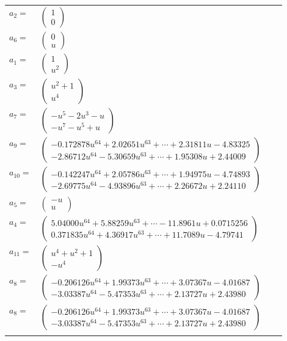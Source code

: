 \documentclass[1p]{elsarticle_modified}
\theoremstyle{definition}
\begin{document}
\begin{tabular}{m{7pt} m{180pt} m{7pt} m{180pt} }
\flushright $a_{2}=$&$\begin{pmatrix}1\\0\end{pmatrix}$ \\
\flushright $a_{6}=$&$\begin{pmatrix}0\\u\end{pmatrix}$ \\
\flushright $a_{1}=$&$\begin{pmatrix}1\\u^2\end{pmatrix}$ \\
\flushright $a_{3}=$&$\begin{pmatrix}u^2+1\\u^4\end{pmatrix}$ \\
\flushright $a_{7}=$&$\begin{pmatrix}- u^5-2 u^3- u\\- u^7- u^5+u\end{pmatrix}$ \\
\flushright $a_{9}=$&$\begin{pmatrix}-0.172878 u^{64}+2.02651 u^{63}+\cdots+2.31811 u-4.83325\\-2.86712 u^{64}-5.30659 u^{63}+\cdots+1.95308 u+2.44009\end{pmatrix}$ \\
\flushright $a_{10}=$&$\begin{pmatrix}-0.142247 u^{64}+2.05786 u^{63}+\cdots+1.94975 u-4.74893\\-2.69775 u^{64}-4.93896 u^{63}+\cdots+2.26672 u+2.24110\end{pmatrix}$ \\
\flushright $a_{5}=$&$\begin{pmatrix}- u\\u\end{pmatrix}$ \\
\flushright $a_{4}=$&$\begin{pmatrix}5.04000 u^{64}+5.88259 u^{63}+\cdots-11.8961 u+0.0715256\\0.371835 u^{64}+4.36917 u^{63}+\cdots+11.7089 u-4.79741\end{pmatrix}$ \\
\flushright $a_{11}=$&$\begin{pmatrix}u^4+u^2+1\\- u^4\end{pmatrix}$ \\
\flushright $a_{8}=$&$\begin{pmatrix}-0.206126 u^{64}+1.99373 u^{63}+\cdots+3.07367 u-4.01687\\-3.03387 u^{64}-5.47353 u^{63}+\cdots+2.13727 u+2.43980\end{pmatrix}$\\ \flushright $a_{8}=$&$\begin{pmatrix}-0.206126 u^{64}+1.99373 u^{63}+\cdots+3.07367 u-4.01687\\-3.03387 u^{64}-5.47353 u^{63}+\cdots+2.13727 u+2.43980\end{pmatrix}$\\&\end{tabular}
\end{document}
